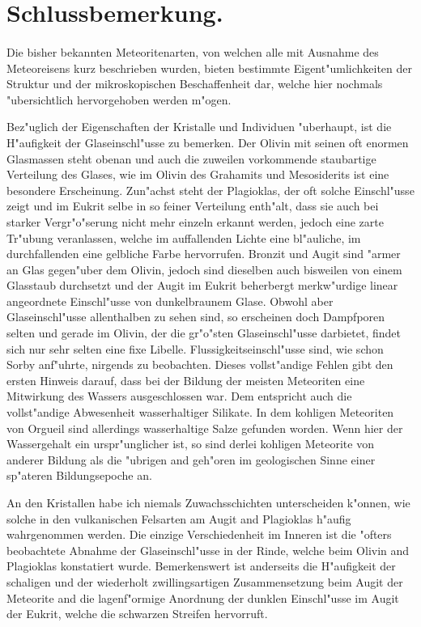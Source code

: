 \documentclass[a4paper, 11pt, oneside, polutonikogreek, german]{article}
\begin{document}
\section{Schlussbemerkung.}
\paragraph*{}
Die bisher bekannten Meteoritenarten, von welchen alle mit Ausnahme des Meteoreisens kurz beschrieben wurden, bieten bestimmte Eigent"umlichkeiten der Struktur und der mikroskopischen Beschaffenheit dar, welche hier nochmals "ubersichtlich hervorgehoben werden m"ogen.

Bez"uglich der Eigenschaften der Kristalle und Individuen "uberhaupt, ist die H"aufigkeit der Glaseinschl"usse zu bemerken. Der Olivin mit seinen oft enormen Glasmassen steht obenan und auch die zuweilen vorkommende staubartige Verteilung des Glases, wie im Olivin des Grahamits und Mesosiderits ist eine besondere Erscheinung. Zun"achst steht der Plagioklas, der oft solche Einschl"usse zeigt und im Eukrit selbe in so feiner Verteilung enth"alt, dass sie auch bei starker Vergr"o"serung nicht mehr einzeln erkannt werden, jedoch eine zarte Tr"ubung veranlassen, welche im auffallenden Lichte eine bl"auliche, im durchfallenden eine gelbliche Farbe hervorrufen. Bronzit und Augit sind "armer an Glas gegen"uber dem Olivin, jedoch sind dieselben auch bisweilen von einem Glasstaub durchsetzt und der Augit im Eukrit beherbergt merkw"urdige linear angeordnete Einschl"usse von dunkelbraunem Glase. Obwohl aber Glaseinschl"usse allenthalben zu sehen sind, so erscheinen doch Dampfporen selten und gerade im Olivin, der die gr"o"sten Glaseinschl"usse darbietet, findet sich nur sehr selten eine fixe Libelle. Flussigkeitseinschl"usse sind, wie schon Sorby anf"uhrte, nirgends zu beobachten. Dieses vollst"andige Fehlen gibt den ersten Hinweis darauf, dass bei der Bildung der meisten Meteoriten eine Mitwirkung des Wassers ausgeschlossen war. Dem entspricht auch die vollst"andige Abwesenheit wasserhaltiger Silikate. In dem kohligen Meteoriten von Orgueil sind allerdings wasserhaltige Salze gefunden worden. Wenn hier der Wassergehalt ein urspr"unglicher ist, so sind derlei kohligen Meteorite von anderer Bildung als die "ubrigen and geh"oren im geologischen Sinne einer sp"ateren Bildungsepoche an.

An den Kristallen habe ich niemals Zuwachsschichten unterscheiden k"onnen, wie solche in den vulkanischen Felsarten am Augit and Plagioklas h"aufig wahrgenommen werden. Die einzige Verschiedenheit im Inneren ist die "ofters beobachtete Abnahme der Glaseinschl"usse in der Rinde, welche beim Olivin and Plagioklas konstatiert wurde. Bemerkenswert ist anderseits die H"aufigkeit der schaligen und der wiederholt zwillingsartigen Zusammensetzung beim Augit der Meteorite and die lagenf"ormige Anordnung der dunklen Einschl"usse im Augit der Eukrit, welche die schwarzen Streifen hervorruft.
\end{document}
